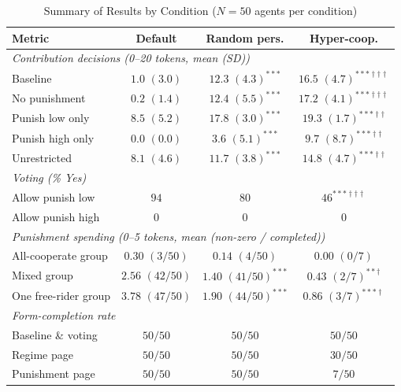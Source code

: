 \documentclass[12pt, a4paper]{article}
\begin{document}
\begin{table}[H]
\centering
\caption{Summary of Results by Condition ($N=50$ agents per condition)}
\label{tab:results}
\small
\begin{tabular}{lccc}
\toprule
Metric & Default & Random pers. & Hyper-coop. \\
\midrule
\multicolumn{4}{l}{\textit{Contribution decisions (0--20 tokens, mean (SD))}} \\
\quad Baseline                 & $1.0$ $(3.0)$ & $12.3$ $(4.3)^{***}$ & $16.5$ $(4.7)^{***\dagger\dagger\dagger}$ \\
\quad No punishment            & $0.2$ $(1.4)$ & $12.4$ $(5.5)^{***}$ & $17.2$ $(4.1)^{***\dagger\dagger\dagger}$ \\
\quad Punish low only          & $8.5$ $(5.2)$ & $17.8$ $(3.0)^{***}$ & $19.3$ $(1.7)^{***\dagger\dagger}$ \\
\quad Punish high only         & $0.0$ $(0.0)$ & $3.6$  $(5.1)^{***}$ & $9.7$  $(8.7)^{***\dagger\dagger}$ \\
\quad Unrestricted             & $8.1$ $(4.6)$ & $11.7$ $(3.8)^{***}$ & $14.8$ $(4.7)^{***\dagger\dagger}$ \\
\midrule
\multicolumn{4}{l}{\textit{Voting (\% Yes)}} \\
\quad Allow punish low         & $94$ & $80$ & $46^{***\dagger\dagger\dagger}$ \\
\quad Allow punish high        & $0$  & $0$  & $0$ \\
\midrule
\multicolumn{4}{l}{\textit{Punishment spending (0--5 tokens, mean (non-zero / completed))}} \\
\quad All-cooperate group      & $0.30$ $(3/50)$  & $0.14$ $(4/50)$       & $0.00$ $(0/7)$ \\
\quad Mixed group              & $2.56$ $(42/50)$ & $1.40$ $(41/50)^{***}$& $0.43$ $(2/7)^{**\dagger}$ \\
\quad One free-rider group     & $3.78$ $(47/50)$ & $1.90$ $(44/50)^{***}$& $0.86$ $(3/7)^{***\dagger}$ \\
\midrule
\multicolumn{4}{l}{\textit{Form-completion rate}} \\
\quad Baseline \& voting       & $50/50$ & $50/50$ & $50/50$ \\
\quad Regime page              & $50/50$ & $50/50$ & $30/50$ \\
\quad Punishment page          & $50/50$ & $50/50$ & $7/50$ \\
\bottomrule
\end{tabular}


\end{table}
\end{document}
